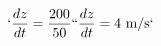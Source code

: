 \documentclass[preview]{standalone}
\begin{document}
\begin{align*}
`\frac{dz}{dt} = \frac{200}{50}`
`\frac{dz}{dt} = 4 \text{ m/s}`
\end{align*}
\end{document}
